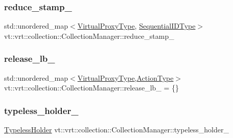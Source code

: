 \subsubsection{\texorpdfstring{reduce\+\_\+stamp\+\_\+}{reduce\_stamp\_}}
{\footnotesize\ttfamily std\+::unordered\+\_\+map$<$\hyperlink{namespacevt_a1b417dd5d684f045bb58a0ede70045ac}{Virtual\+Proxy\+Type}, \hyperlink{namespacevt_a3063d4db3b879d6dd2c7b8d50995c7f6}{Sequential\+I\+D\+Type}$>$ vt\+::vrt\+::collection\+::\+Collection\+Manager\+::reduce\+\_\+stamp\+\_\+\hspace{0.3cm}{\ttfamily [private]}}

\mbox{\label{structvt_1_1vrt_1_1collection_1_1_collection_manager_a42ea6d7733a75f09738a877e90db9aa1}} 
\subsubsection{\texorpdfstring{release\+\_\+lb\+\_\+}{release\_lb\_}}
{\footnotesize\ttfamily std\+::unordered\+\_\+map$<$\hyperlink{namespacevt_a1b417dd5d684f045bb58a0ede70045ac}{Virtual\+Proxy\+Type},\hyperlink{namespacevt_ae0a5a7b18cc99d7b732cb4d44f46b0f3}{Action\+Type}$>$ vt\+::vrt\+::collection\+::\+Collection\+Manager\+::release\+\_\+lb\+\_\+ = \{\}\hspace{0.3cm}{\ttfamily [private]}}

\mbox{\label{structvt_1_1vrt_1_1collection_1_1_collection_manager_a25a7c464bb729079cc0a33cbe4bc4f15}} 
\subsubsection{\texorpdfstring{typeless\+\_\+holder\+\_\+}{typeless\_holder\_}}
{\footnotesize\ttfamily \hyperlink{structvt_1_1vrt_1_1collection_1_1_typeless_holder}{Typeless\+Holder} vt\+::vrt\+::collection\+::\+Collection\+Manager\+::typeless\+\_\+holder\+\_\+\hspace{0.3cm}{\ttfamily [private]}}



